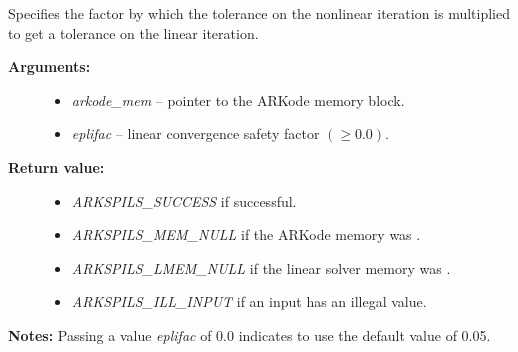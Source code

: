 \documentclass[letterpaper,10pt,english]{sphinxmanual}
\begin{document}
\begin{fulllineitems}
\label{c_interface/User_callable:ARKSpilsSetEpsLin}
Specifies the factor by which the tolerance on the nonlinear
iteration is multiplied to get a tolerance on the linear
iteration.
\begin{description}
\item[{\textbf{Arguments:}}] \leavevmode\begin{itemize}
\item {} 
\emph{arkode\_mem} -- pointer to the ARKode memory block.

\item {} 
\emph{eplifac} -- linear convergence safety factor $(\ge 0.0)$.

\end{itemize}

\item[{\textbf{Return value:}}] \leavevmode\begin{itemize}
\item {} 
\emph{ARKSPILS\_SUCCESS} if successful.

\item {} 
\emph{ARKSPILS\_MEM\_NULL} if the ARKode memory was .

\item {} 
\emph{ARKSPILS\_LMEM\_NULL} if the linear solver memory was .

\item {} 
\emph{ARKSPILS\_ILL\_INPUT} if an input has an illegal value.

\end{itemize}

\end{description}

\textbf{Notes:} Passing a value \emph{eplifac} of 0.0 indicates to use the default value of 0.05.

\end{fulllineitems}

\end{document}
